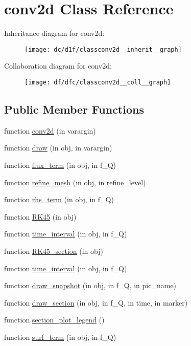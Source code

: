 \hypertarget{classconv2d}{}\section{conv2d Class Reference}
\label{classconv2d}


Inheritance diagram for conv2d\+:
\nopagebreak
\begin{figure}[H]
\begin{center}
\leavevmode
\texttt{[image: dc/d1f/classconv2d\_\_inherit\_\_graph]}
\end{center}
\end{figure}


Collaboration diagram for conv2d\+:
\nopagebreak
\begin{figure}[H]
\begin{center}
\leavevmode
\texttt{[image: df/dfc/classconv2d\_\_coll\_\_graph]}
\end{center}
\end{figure}
\subsection*{Public Member Functions}
\begin{DoxyCompactItemize}
\item 
function \hyperlink{classconv2d_a4a8e998daa8c438d1610ed81a71f38e1}{conv2d} (in varargin)
\item 
function \hyperlink{classconv2d_abd3af15cff04302f73d06d04e45d86d6}{draw} (in obj, in varargin)
\item 
function \hyperlink{classconv2d_a86d512419121988b17d016c33871f45a}{flux\+\_\+term} (in obj, in f\+\_\+Q)
\item 
function \hyperlink{classconv2d_a24b9ca0c930547a4cd6e7f0160c1e5f4}{refine\+\_\+mesh} (in obj, in refine\+\_\+level)
\item 
function \hyperlink{classconv2d_ac7ea96ba4a6d36a3844a747bf0be0f0e}{rhs\+\_\+term} (in obj, in f\+\_\+Q)
\item 
function \hyperlink{classconv2d_ab899ec241ae78b511ead3139860bf345}{R\+K45} (in obj)
\item 
function \hyperlink{classconv2d_a84d8086afe6f762cb80dbb4ea1e021d7}{time\+\_\+interval} (in obj, in f\+\_\+Q)
\item 
function \hyperlink{classconv2d_a6ee58ffcc48803b3ed80286885bf1988}{R\+K45\+\_\+section} (in obj)
\item 
function \hyperlink{classconv2d_a84d8086afe6f762cb80dbb4ea1e021d7}{time\+\_\+interval} (in obj, in f\+\_\+Q)
\item 
function \hyperlink{classconv2d_adc1dfdd372d3010d0cc79f2592d68c1a}{draw\+\_\+snapshot} (in obj, in f\+\_\+Q, in pic\+\_\+name)
\item 
function \hyperlink{classconv2d_aede7eb109a5c42b70fabf370699790ef}{draw\+\_\+section} (in obj, in f\+\_\+Q, in time, in marker)
\item 
function \hyperlink{classconv2d_add0cfe7ba3b7719cf23b1501cc1f2dea}{section\+\_\+plot\+\_\+legend} ()
\item 
function \hyperlink{classconv2d_a0a29acf2442a81ecb667b86485c1950f}{surf\+\_\+term} (in obj, in f\+\_\+Q)
\end{DoxyCompactItemize}
